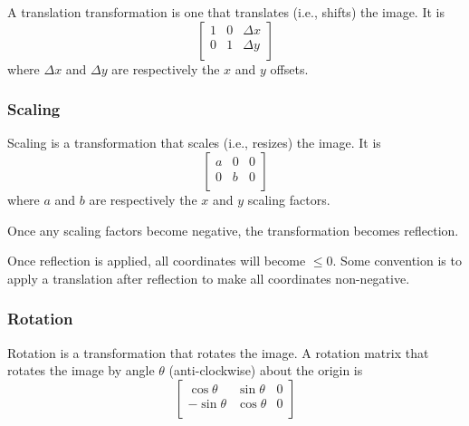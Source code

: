 \documentclass{note}
\begin{document}
A translation transformation is one that translates (i.e., shifts) the image. It is
\begin{equation*}
    \begin{bmatrix}
        1 & 0 & \Delta x \\
        0 & 1 & \Delta y \\
    \end{bmatrix}
\end{equation*}
where $\Delta x$ and $\Delta y$ are respectively the $x$ and $y$ offsets.

\subsubsection{Scaling}

Scaling is a transformation that scales (i.e., resizes) the image. It is
\begin{equation*}
    \begin{bmatrix}
        a & 0 & 0 \\
        0 & b & 0 \\
    \end{bmatrix}
\end{equation*}
where $a$ and $b$ are respectively the $x$ and $y$ scaling factors.

Once any scaling factors become negative, the transformation becomes reflection.

\begin{important}
    Once reflection is applied, all coordinates will become $\le 0$. Some convention is to apply a translation after reflection to make all coordinates non-negative.
\end{important}

\subsubsection{Rotation}

Rotation is a transformation that rotates the image. A rotation matrix that rotates the image by angle $\theta$ (anti-clockwise) about the origin is
\begin{equation*}
    \begin{bmatrix}
         \cos \theta &  \sin \theta & 0 \\
        -\sin \theta &  \cos \theta & 0 \\
    \end{bmatrix}
\end{equation*}
\end{document}
